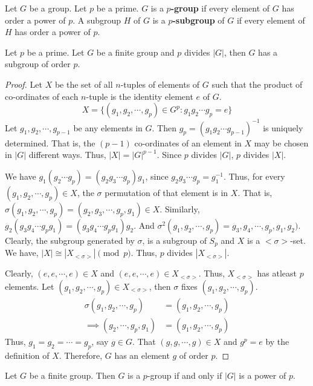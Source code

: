 \begin{definition}
	Let $G$ be a group. Let $p$ be a prime. $G$ is a \textbf{$p$-group} if every element of $G$ has order a power of $p$.
	A subgroup $H$ of $G$ is a \textbf{$p$-subgroup} of $G$ if every element of $H$ has order a power of $p$.
\end{definition}
\begin{theorem}[Cauchy]
	Let $p$ be a prime.
	Let $G$ be a finite group and $p$ divides $|G|$, then $G$ has a subgroup of order $p$.
\end{theorem}
\begin{proof}
	Let $X$ be the set of all $n$-tuples of elements of $G$ such that the product of co-ordinates of each $n$-tuple is the identity element $e$ of $G$.
	\begin{equation}
	X = \{ (g_1,g_2,\cdots,g_p) \in G^p : g_1g_2\cdots g_p = e\}
	\end{equation}
	Let $g_1,g_2,\cdots,g_{p-1}$ be any elements in $G$.
	Then $g_p = (g_1g_2\cdots g_{p-1})^{-1}$ is uniquely determined.
	That is, the $(p-1)$ co-ordinates of an element in $X$ may be chosen in $|G|$ different ways.
	Thus, $|X| = |G|^{p-1}$.
	Since $p$ divides $|G|$, $p$ divides $|X|$.

	We have $g_1(g_2\cdots g_p) = (g_2g_3\cdots g_p)g_1$, since $g_2g_3\cdots g_p = g_1^{-1}$.
	Thus, for every $(g_1,g_2,\cdots,g_p) \in X$, the $\sigma$ permutation of that element is in $X$.
	That is, $\sigma(g_1,g_2,\cdots,g_p) = (g_2,g_3,\cdots,g_p,g_1) \in X$.
	Similarly, $g_2(g_3g_4\cdots g_pg_1) = (g_3g_4\cdots g_pg_1)g_2$.
	And $\sigma^2(g_1,g_2,\cdots,g_p) = g_3,g_4,\cdots,g_p,g_1,g_2)$.
	Clearly, the subgroup generated by $\sigma$, is a subgroup of $S_p$ and $X$ is a $<\!\sigma\!>$-set.
	We have, $|X| \cong |X_{<\sigma>}| \pmod{p}$.
	Thus, $p$ divides $|X_{<\sigma>}|$.

	Clearly, $(e,e,\cdots,e) \in X$ and $(e,e,\cdots,e) \in X_{<\sigma>}$.
	Thus, $X_{<\sigma>}$ has atleast $p$ elements.
	Let $(g_1,g_2,\cdots,g_p) \in X_{<\sigma>}$, then $\sigma$ fixes $(g_1,g_2,\cdots,g_p)$.
	\begin{align*}
		\sigma(g_1,g_2,\cdots,g_p) & = (g_1,g_2,\cdots,g_p)\\
		\implies (g_2,\cdots,g_p,g_1) & = (g_1,g_2,\cdots,g_p)
	\end{align*}
	Thus, $g_1 = g_2 = \cdots = g_p$, say $g \in G$.
	That $(g,g,\cdots,g) \in X$ and $g^p = e$ by the definition of $X$.
	Therefore, $G$ has an element $g$ of order $p$.
\end{proof}
\begin{corollary}
	Let $G$ be a finite group. Then $G$ is a $p$-group if and only if $|G|$ is a power of $p$.
\end{corollary}
